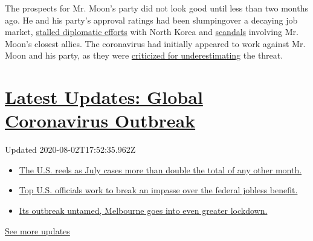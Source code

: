 The prospects for Mr. Moon's party did not look good​ until less than
two months ago​. He and his party's approval ratings had been slumping​
over a decaying job market,
\href{https://www.nytimes3xbfgragh.onion/2019/02/28/world/asia/moon-jae-in-kim-jong.html}{stalled
diplomatic efforts} with North Korea and
\href{https://www.nytimes3xbfgragh.onion/2019/10/21/world/asia/south-korea-cho-kuk-gold-spoon-elite.html}{scandals}
involving Mr. Moon's closest allies.​ ​The coronavirus ​had initially
appeared to work against Mr. Moon and his party​​, as they were
\href{https://www.nytimes3xbfgragh.onion/2020/02/27/world/asia/coronavirus-south-korea.html}{criticized
for underestimating} the threat.

\hypertarget{latest-updates-global-coronavirus-outbreak}{%
\section{\texorpdfstring{\href{https://www.nytimes3xbfgragh.onion/2020/08/01/world/coronavirus-covid-19.html?action=click\&pgtype=Article\&state=default\&region=MAIN_CONTENT_1\&context=storylines_live_updates}{Latest
Updates: Global Coronavirus
Outbreak}}{Latest Updates: Global Coronavirus Outbreak}}\label{latest-updates-global-coronavirus-outbreak}}

Updated 2020-08-02T17:52:35.962Z

\begin{itemize}
\tightlist
\item
  \href{https://www.nytimes3xbfgragh.onion/2020/08/01/world/coronavirus-covid-19.html?action=click\&pgtype=Article\&state=default\&region=MAIN_CONTENT_1\&context=storylines_live_updates\#link-34047410}{The
  U.S. reels as July cases more than double the total of any other
  month.}
\item
  \href{https://www.nytimes3xbfgragh.onion/2020/08/01/world/coronavirus-covid-19.html?action=click\&pgtype=Article\&state=default\&region=MAIN_CONTENT_1\&context=storylines_live_updates\#link-780ec966}{Top
  U.S. officials work to break an impasse over the federal jobless
  benefit.}
\item
  \href{https://www.nytimes3xbfgragh.onion/2020/08/01/world/coronavirus-covid-19.html?action=click\&pgtype=Article\&state=default\&region=MAIN_CONTENT_1\&context=storylines_live_updates\#link-2bc8948}{Its
  outbreak untamed, Melbourne goes into even greater lockdown.}
\end{itemize}

\href{https://www.nytimes3xbfgragh.onion/2020/08/01/world/coronavirus-covid-19.html?action=click\&pgtype=Article\&state=default\&region=MAIN_CONTENT_1\&context=storylines_live_updates}{See
more updates}

